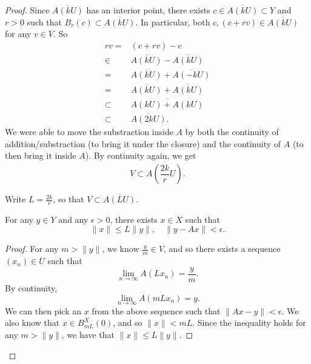 \documentclass[12pt]{article}
\begin{document}
\begin{refsection}
\begin{proof}
	Since $\overline{A(kU)}$ has an interior point, there exists $c\in\overline{A(kU)}\subset Y$ and $r>0$ such that $B_r(c)\subset \overline{A(kU)}$. In particular, both $c,(c+rv)\in \overline{A(kU)}$ for any $v\in V$. So 
	\begin{align*}
		rv =& (c+rv) - c \\
		\in& \overline{A(kU)} - \overline{A(kU)} \\
		=& \overline{A(kU)} + \overline{A(-kU)} \\
		=& \overline{A(kU)} + \overline{A(kU)} \\
		\subset& \overline{A(kU) + A(kU)} \\
		\subset& \overline{A(2kU)}.
	\end{align*}
	We were able to move the substraction inside $A$ by both the continuity of addition/substraction (to bring it under the closure) and the continuity of $A$ (to then bring it inside $A$). By continuity again, we get 
	\begin{equation*}
		V\subset \overline{A\left(\frac{2k}{r}U\right)}.
	\end{equation*}

	Write $L=\frac{2k}{r}$, so that $V\subset \overline{A(LU)}$.

	\begin{proposition}
	\label{prop_open_mapping_of_any_y}
		For any $y\in Y$ and any $\epsilon>0$, there exists $x\in X$ such that 
		\begin{equation*}
			\|x\| \leq L\|y\|, \quad \|y - Ax\| < \epsilon.
		\end{equation*}
	\end{proposition}
	\begin{proof}
		For any $m>\|y\|$, we know $\frac{y}{m}\in V$, and so there exists a sequence $(x_n)\in U$ such that  
		\begin{equation*}
			\lim_{n\to\infty}A\left(Lx_n\right) = \frac{y}{m}.
		\end{equation*}
		By continuity, 
		\begin{equation*}
			\lim_{n\to\infty}A\left(mLx_n\right) = y.	
		\end{equation*}
		We can then pick an $x$ from the above sequence such that $\|Ax-y\|<\epsilon$. We also know that $x\in B_{mL}^X(0)$, and so $\|x\| < mL$. Since the inequality holds for any $m>\|y\|$, we have that $\|x\|\leq L\|y\|$.
	\end{proof}


\end{proof}
\end{refsection}
\end{document}
